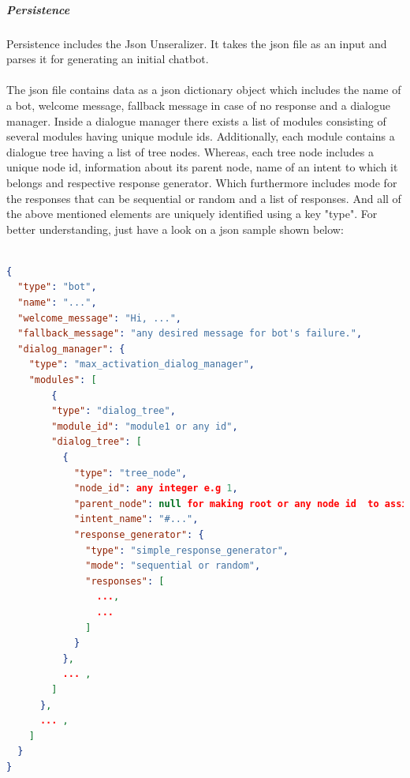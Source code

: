 \subparagraph*{Persistence}
Persistence includes the Json Unseralizer. It takes the json file as an input and parses it for generating an initial chatbot.
\\~\\
The json file contains data as a json dictionary object which includes the name of a bot, welcome message, fallback message in case of no response and a dialogue manager. Inside a dialogue manager there exists a list of modules consisting of several modules having unique module ids. Additionally, each module contains a dialogue tree having a list of tree nodes. Whereas, each tree node includes a unique node id, information about its parent node, name of an intent to which it belongs and respective response generator. Which furthermore includes mode for the responses that can be sequential or random and a list of responses. And all of the above mentioned elements are uniquely identified using a key "type". For better understanding, just have a look on a json sample shown below:
\\~\\
\begin{lstlisting}[language=json, firstnumber=1]
{
  "type": "bot",
  "name": "...",
  "welcome_message": "Hi, ...",
  "fallback_message": "any desired message for bot's failure.",
  "dialog_manager": {
    "type": "max_activation_dialog_manager",
    "modules": [
        {
        "type": "dialog_tree",
        "module_id": "module1 or any id",
        "dialog_tree": [
          {
            "type": "tree_node",
            "node_id": any integer e.g 1,
            "parent_node": null for making root or any node id  to assign it a parent,
            "intent_name": "#...",
            "response_generator": {
              "type": "simple_response_generator",
              "mode": "sequential or random",
              "responses": [
                ...,
                ...
              ]
            }
          },
          ... ,
        ]
      },
      ... ,
    ]
  }
}
\end{lstlisting}

